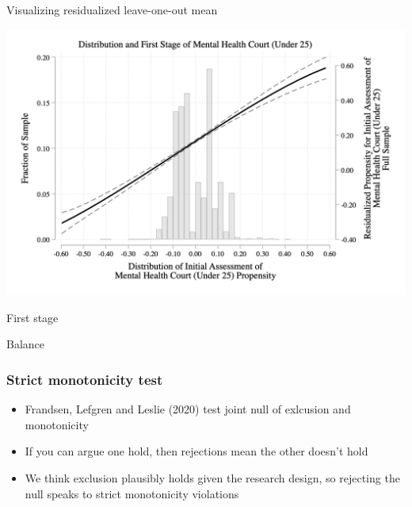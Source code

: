 \documentclass{beamer}
\begin{document}
\begin{frame}{Visualizing residualized leave-one-out mean}

  \includegraphics[width=\textwidth]{./lecture_includes/under25_samp_FirstStage_all.png}


\end{frame}


\begin{frame}{First stage}

  

\end{frame}


\begin{frame}[shrink=20]{Balance}

  

\end{frame}




\begin{frame}
  \frametitle{Strict monotonicity test}

  \begin{itemize}
    \item Frandsen, Lefgren and Leslie (2020) test joint null of exlcusion and monotonicity
    \item If you can argue one hold, then rejections mean the other doesn't hold

    \item We think exclusion plausibly holds given the research design, so rejecting the null speaks to strict monotonicity violations


  \end{itemize}
\end{frame}
\end{document}
